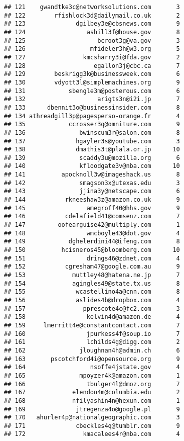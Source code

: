 \documentclass[]{article}
\begin{document}
\begin{verbatim}
## 121    gwandtke3c@networksolutions.com       3
## 122        rfishlock3d@dailymail.co.uk       2
## 123              dgilbey3e@cbsnews.com       9
## 124                 ashill3f@house.gov       8
## 125                    bcroot3g@va.gov       3
## 126                  mfideler3h@w3.org       5
## 127                kmcsharry3i@fda.gov       2
## 128                   egallon3j@cbc.ca       7
## 129        beskrigg3k@businessweek.com       6
## 130        vdyott3l@simplemachines.org       9
## 131            sbengle3m@posterous.com       6
## 132                    arigts3n@i2i.jp       7
## 133      dbennit3o@businessinsider.com       8
## 134 athreadgill3p@pagesperso-orange.fr       4
## 135            ccrosser3q@omniture.com       9
## 136               bwinscum3r@salon.com       8
## 137              hgayler3s@youtube.com       3
## 138              dmathis3t@plala.or.jp      10
## 139               scaddy3u@mozilla.org       6
## 140               kfloodgate3v@nba.com      10
## 141          apocknoll3w@imageshack.us       8
## 142               smagson3x@utexas.edu       3
## 143               jjina3y@netscape.com       6
## 144           rkneeshaw3z@amazon.co.uk       9
## 145                 amegroff40@hhs.gov       9
## 146           cdelafield41@comsenz.com       7
## 147         oofearguise42@multiply.com       1
## 148                 wmcboyle43@dot.gov       4
## 149            dghelerdini44@ifeng.com       8
## 150          hcisneros45@bloomberg.com      10
## 151                 drings46@zdnet.com       4
## 152           cgresham47@google.com.au       9
## 153             muttley48@hatena.ne.jp       7
## 154             agingles49@state.tx.us       8
## 155              wcastellino4a@cnn.com       8
## 156              aslides4b@dropbox.com       4
## 157                pprescote4c@fc2.com       3
## 158                 kelvin4d@amazon.de       4
## 159     lmerritt4e@constantcontact.com       7
## 160                 jpurkess4f@soup.io       7
## 161                 lchilds4g@digg.com       2
## 162               jloughnan4h@admin.ch       6
## 163       pscotchford4i@opensource.org       9
## 164                  nsoffe4jstate.gov       4
## 165               mpoyzer4k@amazon.com       1
## 166                 tbulger4l@dmoz.org       7
## 167             elendon4m@columbia.edu       2
## 168             nfilyashin4n@hexun.com       1
## 169              jtregenza4o@google.pl       9
## 170   ahurler4p@nationalgeographic.com       3
## 171              cbeckles4q@tumblr.com       9
## 172                kmacalees4r@nba.com       4

\end{verbatim}
\end{document}
